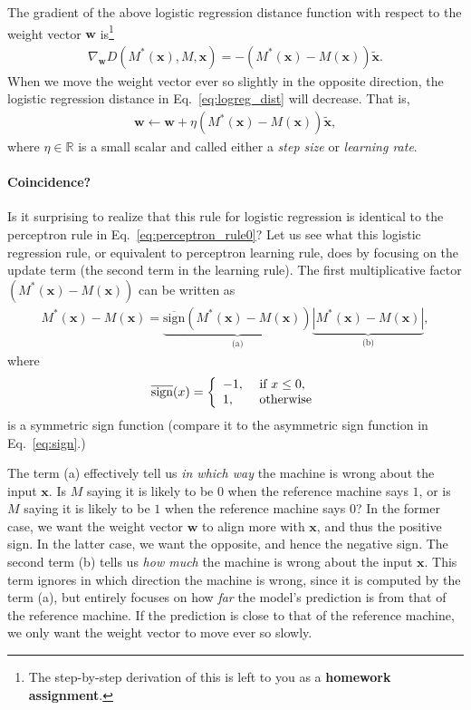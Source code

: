 \documentclass{report}
\newcommand{\vect}[1]{\mathbf{#1}}
\newcommand{\vx}[0]{\vect{x}}
\newcommand{\vw}[0]{\vect{w}}
\newcommand{\sign}{\text{sign}}
\begin{document}
The gradient of the above logistic regression distance function with respect to
the weight vector $\vw$ is\footnote{
    The step-by-step derivation of this is left to you as a {\bf homework
    assignment}. 
}
\begin{align}
    \label{eq:grad_logreg_dist}
    \nabla_{\vw} D(M^*(\vx), M, \vx) = -(M^*(\vx) - M(\vx)) \tilde{\vx}.
\end{align}
When we move the weight vector ever so slightly in the opposite direction, the
logistic regression distance in Eq.~\eqref{eq:logreg_dist} will decrease. That
is,
\begin{align}
    \label{eq:logreg_rule0}
    \vw \leftarrow \vw + \eta \left( M^*(\vx) - M(\vx)\right) \tilde{\vx},
\end{align}
where $\eta \in \mathbb{R}$ is a small scalar and called either a {\it step
size} or {\it learning rate}. 

\paragraph{Coincidence?}

Is it surprising to realize that this rule for logistic regression is identical
to the perceptron rule in Eq.~\eqref{eq:perceptron_rule0}? Let us see what this
logistic regression rule, or equivalent to perceptron learning rule, does by
focusing on the update term (the second term in the learning rule). The first
multiplicative factor $(M^*(\vx) - M(\vx))$ can be written as
\begin{align}
    \label{eq:grad_logreg_term1}
    M^*(\vx) - M(\vx) = \underbrace{\overline{\sign}(M^*(\vx) - M(\vx))}_{\text{(a)}}
    \underbrace{\left| M^*(\vx) - M(\vx) \right|}_{\text{(b)}},
\end{align}
where 
\begin{align*}
    \overline{\sign}(x) = \left\{ \begin{array}{l l}
            -1,&\text{ if } x \leq 0, \\
            1,&\text{ otherwise}
        \end{array}
        \right.
\end{align*}
is a symmetric sign function (compare it to the asymmetric sign function in
Eq.~\eqref{eq:sign}.)

The term (a) effectively tell us {\it in which way} the machine is wrong about
the input $\vx$. Is $M$ saying it is likely to be $0$ when the reference machine
says $1$, or is $M$ saying it is likely to be $1$ when the reference machine
says $0$? In the former case, we want the weight vector $\vw$ to align more with
$\vx$, and thus the positive sign. In the latter case, we want the opposite, and
hence the negative sign.  The second term (b) tells us {\it how much} the
machine is wrong about the input $\vx$. This term ignores in which direction the
machine is wrong, since it is computed by the term (a), but entirely focuses on
how {\it far} the model's prediction is from that of the reference machine. If
the prediction is close to that of the reference machine, we only want the
weight vector to move ever so slowly.
\end{document}
